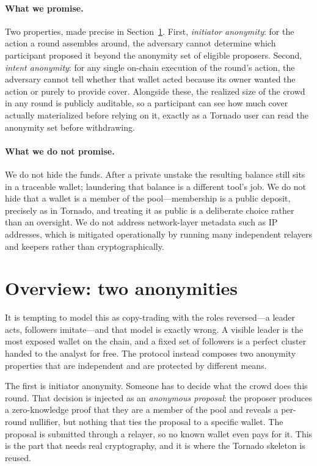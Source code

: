 \documentclass[11pt]{article}
\begin{document}
\paragraph{What we promise.} Two properties, made precise in
Section~\ref{sec:overview}. First, \emph{initiator anonymity}: for the action a
round assembles around, the adversary cannot determine which participant
proposed it beyond the anonymity set of eligible proposers. Second, \emph{intent
anonymity}: for any single on-chain execution of the round's action, the
adversary cannot tell whether that wallet acted because its owner wanted the
action or purely to provide cover. Alongside these, the realized size of the
crowd in any round is publicly auditable, so a participant can see how much cover
actually materialized before relying on it, exactly as a Tornado user can read
the anonymity set before withdrawing.

\paragraph{What we do not promise.} We do not hide the funds. After a private
unstake the resulting balance still sits in a traceable wallet; laundering that
balance is a different tool's job. We do not hide that a wallet is a member of
the pool---membership is a public deposit, precisely as in Tornado, and treating
it as public is a deliberate choice rather than an oversight. We do not address
network-layer metadata such as IP addresses, which is mitigated operationally by
running many independent relayers and keepers rather than cryptographically.

\section{Overview: two anonymities}
\label{sec:overview}

It is tempting to model this as copy-trading with the roles reversed---a leader
acts, followers imitate---and that model is exactly wrong. A visible leader is
the most exposed wallet on the chain, and a fixed set of followers is a perfect
cluster handed to the analyst for free. The protocol instead composes two
anonymity properties that are independent and are protected by different means.

The first is initiator anonymity. Someone has to decide what the crowd does this
round. That decision is injected as an \emph{anonymous proposal}: the proposer
produces a zero-knowledge proof that they are a member of the pool and reveals a
per-round nullifier, but nothing that ties the proposal to a specific wallet. The
proposal is submitted through a relayer, so no known wallet even pays for it.
This is the part that needs real cryptography, and it is where the Tornado
skeleton is reused.
\end{document}
